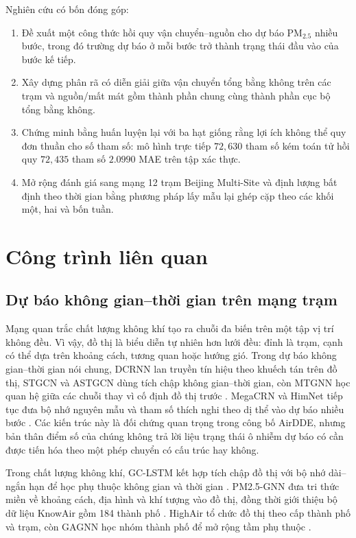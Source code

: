 \documentclass[10pt,a4paper]{article}
\newcommand{\pmfine}{PM$_{2.5}$}
\begin{document}
Nghiên cứu có bốn đóng góp:
\begin{enumerate}
  \item Đề xuất một công thức hồi quy vận chuyển--nguồn cho dự báo \pmfine{} nhiều bước, trong đó trường dự báo ở mỗi bước trở thành trạng thái đầu vào của bước kế tiếp.
  \item Xây dựng phân rã có diễn giải giữa vận chuyển tổng bằng không trên các trạm và nguồn/mất mát gồm thành phần chung cùng thành phần cục bộ tổng bằng không.
  \item Chứng minh bằng huấn luyện lại với ba hạt giống rằng lợi ích không thể quy đơn thuần cho số tham số: mô hình trực tiếp $72{,}630$ tham số kém toán tử hồi quy $72{,}435$ tham số $2.0990$ MAE trên tập xác thực.
  \item Mở rộng đánh giá sang mạng 12 trạm Beijing Multi-Site và định lượng bất định theo thời gian bằng phương pháp lấy mẫu lại ghép cặp theo các khối một, hai và bốn tuần.
\end{enumerate}

\section{Công trình liên quan}

\subsection{Dự báo không gian--thời gian trên mạng trạm}

Mạng quan trắc chất lượng không khí tạo ra chuỗi đa biến trên một tập vị trí không đều. Vì vậy, đồ thị là biểu diễn tự nhiên hơn lưới đều: đỉnh là trạm, cạnh có thể dựa trên khoảng cách, tương quan hoặc hướng gió. Trong dự báo không gian--thời gian nói chung, DCRNN lan truyền tín hiệu theo khuếch tán trên đồ thị, STGCN và ASTGCN dùng tích chập không gian--thời gian, còn MTGNN học quan hệ giữa các chuỗi thay vì cố định đồ thị trước \citep{li2018dcrnn,yu2018stgcn,guo2019astgcn,wu2020mtgnn}. MegaCRN và HimNet tiếp tục đưa bộ nhớ nguyên mẫu và tham số thích nghi theo dị thể vào dự báo nhiều bước \citep{jiang2023megacrn,dong2024himnet}. Các kiến trúc này là đối chứng quan trọng trong công bố AirDDE, nhưng bản thân điểm số của chúng không trả lời liệu trạng thái ô nhiễm dự báo có cần được tiến hóa theo một phép chuyển có cấu trúc hay không.

Trong chất lượng không khí, GC-LSTM kết hợp tích chập đồ thị với bộ nhớ dài--ngắn hạn để học phụ thuộc không gian và thời gian \citep{qi2019gclstm}. PM2.5-GNN đưa tri thức miền về khoảng cách, địa hình và khí tượng vào đồ thị, đồng thời giới thiệu bộ dữ liệu KnowAir gồm 184 thành phố \citep{wang2020pm25gnn}. HighAir tổ chức đồ thị theo cấp thành phố và trạm, còn GAGNN học nhóm thành phố để mở rộng tầm phụ thuộc \citep{xu2021highair,chen2021gagnn}.
\end{document}
